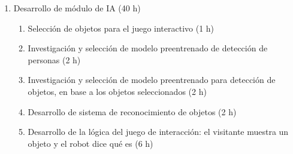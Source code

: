 \documentclass[
11pt, %
]{charter}
\begin{document}
\begin{enumerate}
	\begin{enumerate}
	\item Definir el diseño del firmware del sistema (3 h)
	\item Configuración del entorno de desarrollo y del análisis estático (6 h)
	\item Generación de protocolo de comunicación propio del robot (8 h)
	\item Implementación de driver de pantalla LCD (8 h)
	\item Implementación de driver de pruebas de pantalla LCD (6 h)
	\item Implementación de driver de movimiento de servos (4 h)
	\item Implementación de driver de prueba de movimiento de servos (4 h)
	\item Implementación de driver de sensores de cercanía/detección (6 h)
	\item Implementación de driver de prueba de sensores de cercanía/detección (6 h)
	\item Implementación de driver de entrada de audio (6 h)
	\item Implementación de driver de salida de audio (6 h)
	\item Implementación de la máquina de estados de expresiones (6 h)
	\item Implementación de la animación de ojos y boca (6 h)
	\item Control de servos con realimentación y seguimiento de la mirada (8 h)
	\item Lógica de detección de presencia, salida del visitante y mensaje de despedida (6 h)
	\item Implementación de telemetría del firmware (6 h)
	\item Tests unitarios de la lógica de comportamiento (6 h)
	\end{enumerate}
\item Desarrollo de módulo de IA (40 h)
	\begin{enumerate}
		\item Selección de objetos para el juego interactivo (1 h)
		\item Investigación y selección de modelo preentrenado de detección de personas (2 h)
		\item Investigación y selección de modelo preentrenado para detección de objetos, en base a los objetos seleccionados (2 h)
		\item Desarrollo de sistema de reconocimiento de objetos (2 h)
		\item Desarrollo de la lógica del juego de interacción: el visitante muestra un objeto y el robot dice qué es (6 h)

\end{enumerate}
\end{enumerate}
\end{document}
